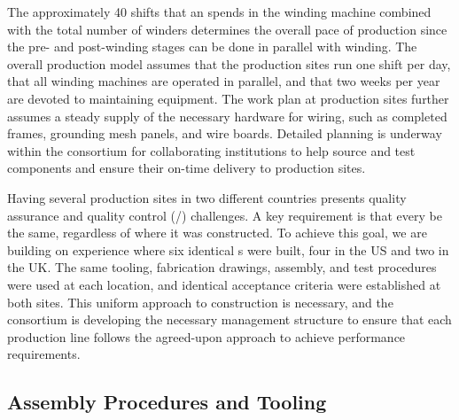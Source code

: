 The approximately \num{40} shifts that an  spends in the winding machine combined with %
the total number of winders determines the overall pace of production since the pre- and post-winding stages can be done in parallel with winding.  %
The overall production model assumes that the  production sites run one shift per day, that all winding machines are operated in parallel, and that two weeks per year are devoted to maintaining equipment.  The work plan at production sites further assumes a steady supply of the necessary hardware for  wiring, such as completed frames, grounding mesh panels, and wire boards.  Detailed planning is underway within the  consortium %
for collaborating institutions to help  source and test components and ensure their on-time delivery to production sites.        

Having several  production sites in two different countries presents quality assurance and quality control (/) challenges. %
A key requirement is that every  be the same, regardless of where it was constructed. To achieve this goal, we are building on  experience where six identical s were built, four in the US and two in the UK. The same tooling, fabrication drawings, assembly, and test procedures were used at each location, and identical acceptance criteria were established at both sites.  This uniform approach to construction %
is necessary, and the  consortium is developing the necessary management structure to ensure that each production line follows the agreed-upon approach to achieve  performance requirements.


\subsection{Assembly Procedures and Tooling}
\label{sec:fdsp-apa-prod-tooling}


